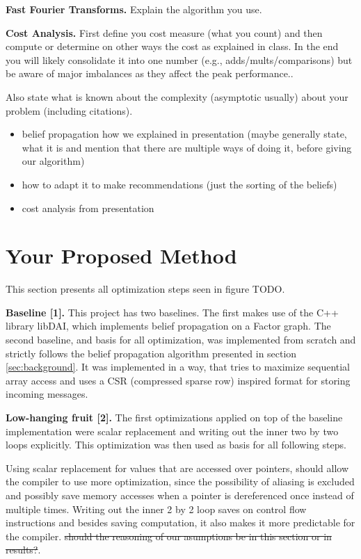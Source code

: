 \documentclass[letterpaper]{article}
\newcommand{\mypar}[1]{{\bf #1.}}
\begin{document}
\mypar{Fast Fourier Transforms}
Explain the algorithm you use.

\mypar{Cost Analysis}
First define you cost measure (what you count) and then compute or determine on other ways the
cost as explained in class. In the end you will likely consolidate it into one number (e.g., adds/mults/comparisons) but be aware of major imbalances as they affect the peak performance..

Also state what is known about the complexity (asymptotic usually)
about your problem (including citations).

\begin{itemize}
\item belief propagation how we explained in presentation (maybe generally state, what it is and mention that there are multiple ways of doing it, before giving our algorithm)
\item how to adapt it to make recommendations (just the sorting of the beliefs)
\item cost analysis from presentation
\end{itemize}


\section{Your Proposed Method}\label{sec:yourmethod}

This section presents all optimization steps seen in figure TODO.

\mypar{Baseline [1]}
This project has two baselines. The first makes use of the C++ library libDAI, which implements belief propagation on a Factor graph.
The second baseline, and basis for all optimization, was implemented from scratch and strictly follows the belief propagation algorithm presented in section \ref{sec:background}. It was implemented in a way, that tries to maximize sequential array access and uses a CSR (compressed sparse row) inspired format for storing incoming messages.

\mypar{Low-hanging fruit [2]}
The first optimizations applied on top of the baseline implementation were scalar replacement and writing out the inner two by two loops explicitly.  This optimization was then used as basis for all following steps.

Using scalar replacement for values that are accessed over pointers, should allow the compiler to use more optimization, since the possibility of aliasing is excluded and possibly save memory accesses when a pointer is dereferenced once instead of multiple times.
Writing out the inner 2 by 2 loop saves on control flow instructions and besides saving computation, it also makes it more predictable for the compiler. \st{should the reasoning of our asumptions be in this section or in results?}. 
\end{document}
